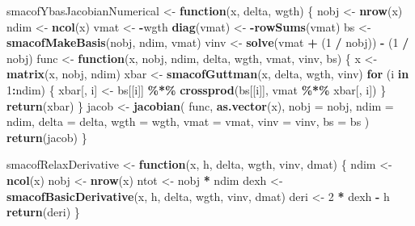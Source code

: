 \documentclass[
  12pt,
]{article}
\newenvironment{Shaded}{\begin{snugshade}}{\end{snugshade}}
\newcommand{\AttributeTok}[1]{\textcolor[rgb]{0.13,0.29,0.53}{#1}}
\newcommand{\ControlFlowTok}[1]{\textcolor[rgb]{0.13,0.29,0.53}{\textbf{#1}}}
\newcommand{\DecValTok}[1]{\textcolor[rgb]{0.00,0.00,0.81}{#1}}
\newcommand{\FunctionTok}[1]{\textcolor[rgb]{0.13,0.29,0.53}{\textbf{#1}}}
\newcommand{\NormalTok}[1]{#1}
\newcommand{\OtherTok}[1]{\textcolor[rgb]{0.56,0.35,0.01}{#1}}
\newcommand{\SpecialCharTok}[1]{\textcolor[rgb]{0.81,0.36,0.00}{\textbf{#1}}}
\begin{document}
\begin{Shaded}
\begin{Highlighting}[]
\NormalTok{smacofYbasJacobianNumerical }\OtherTok{\textless{}{-}} \ControlFlowTok{function}\NormalTok{(x, delta, wgth) \{}
\NormalTok{  nobj }\OtherTok{\textless{}{-}} \FunctionTok{nrow}\NormalTok{(x)}
\NormalTok{  ndim }\OtherTok{\textless{}{-}} \FunctionTok{ncol}\NormalTok{(x)}
\NormalTok{  vmat }\OtherTok{\textless{}{-}} \SpecialCharTok{{-}}\NormalTok{wgth}
  \FunctionTok{diag}\NormalTok{(vmat) }\OtherTok{\textless{}{-}} \SpecialCharTok{{-}}\FunctionTok{rowSums}\NormalTok{(vmat)}
\NormalTok{  bs }\OtherTok{\textless{}{-}} \FunctionTok{smacofMakeBasis}\NormalTok{(nobj, ndim, vmat)}
\NormalTok{  vinv }\OtherTok{\textless{}{-}} \FunctionTok{solve}\NormalTok{(vmat }\SpecialCharTok{+}\NormalTok{ (}\DecValTok{1} \SpecialCharTok{/}\NormalTok{ nobj)) }\SpecialCharTok{{-}}\NormalTok{ (}\DecValTok{1} \SpecialCharTok{/}\NormalTok{ nobj)}
\NormalTok{  func }\OtherTok{\textless{}{-}} \ControlFlowTok{function}\NormalTok{(x, nobj, ndim, delta, wgth, vmat, vinv, bs) \{}
\NormalTok{    x }\OtherTok{\textless{}{-}} \FunctionTok{matrix}\NormalTok{(x, nobj, ndim)}
\NormalTok{    xbar }\OtherTok{\textless{}{-}} \FunctionTok{smacofGuttman}\NormalTok{(x, delta, wgth, vinv)}
    \ControlFlowTok{for}\NormalTok{ (i }\ControlFlowTok{in} \DecValTok{1}\SpecialCharTok{:}\NormalTok{ndim) \{}
\NormalTok{      xbar[, i] }\OtherTok{\textless{}{-}}\NormalTok{ bs[[i]] }\SpecialCharTok{\%*\%} \FunctionTok{crossprod}\NormalTok{(bs[[i]], vmat }\SpecialCharTok{\%*\%}\NormalTok{ xbar[, i])}
\NormalTok{    \}}
    \FunctionTok{return}\NormalTok{(xbar)}
\NormalTok{  \}}
\NormalTok{  jacob }\OtherTok{\textless{}{-}} \FunctionTok{jacobian}\NormalTok{(}
\NormalTok{    func,}
    \FunctionTok{as.vector}\NormalTok{(x),}
    \AttributeTok{nobj =}\NormalTok{ nobj,}
    \AttributeTok{ndim =}\NormalTok{ ndim,}
    \AttributeTok{delta =}\NormalTok{ delta,}
    \AttributeTok{wgth =}\NormalTok{ wgth,}
    \AttributeTok{vmat =}\NormalTok{ vmat,}
    \AttributeTok{vinv =}\NormalTok{ vinv,}
    \AttributeTok{bs =}\NormalTok{ bs}
\NormalTok{  )}
  \FunctionTok{return}\NormalTok{(jacob)}
\NormalTok{\}}


\NormalTok{smacofRelaxDerivative }\OtherTok{\textless{}{-}} \ControlFlowTok{function}\NormalTok{(x, h, delta, wgth, vinv, dmat) \{}
\NormalTok{  ndim }\OtherTok{\textless{}{-}} \FunctionTok{ncol}\NormalTok{(x)}
\NormalTok{  nobj }\OtherTok{\textless{}{-}} \FunctionTok{nrow}\NormalTok{(x)}
\NormalTok{  ntot }\OtherTok{\textless{}{-}}\NormalTok{ nobj }\SpecialCharTok{*}\NormalTok{ ndim}
\NormalTok{  dexh }\OtherTok{\textless{}{-}} \FunctionTok{smacofBasicDerivative}\NormalTok{(x, h, delta, wgth, vinv, dmat)}
\NormalTok{  deri }\OtherTok{\textless{}{-}} \DecValTok{2} \SpecialCharTok{*}\NormalTok{ dexh }\SpecialCharTok{{-}}\NormalTok{ h}
  \FunctionTok{return}\NormalTok{(deri)}
\NormalTok{\}}


\end{Highlighting}
\end{Shaded}
\end{document}
